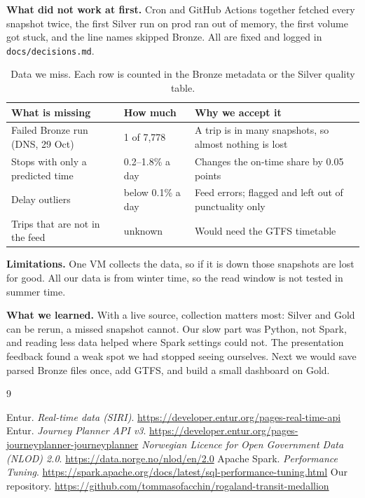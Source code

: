\documentclass[11pt,a4paper]{article}
\newcommand{\code}[1]{\texttt{#1}}
\begin{document}
\textbf{What did not work at first.} Cron and GitHub Actions together fetched every snapshot
twice, the first Silver run on prod ran out of memory, the first volume got stuck, and the line
names skipped Bronze. All are fixed and logged in \code{docs/decisions.md}.

\begin{table}[htb]
\centering\small
\renewcommand{\arraystretch}{1.25}
\begin{tabularx}{\linewidth}{@{}>{\raggedright}p{4.5cm}>{\raggedright}p{2.4cm}X@{}}
\toprule
What is missing & How much & Why we accept it \\
\midrule
Failed Bronze run (DNS, 29 Oct) & 1 of 7{,}778 & A trip is in many snapshots, so almost nothing is lost \\
Stops with only a predicted time & 0.2--1.8\% a day & Changes the on-time share by 0.05 points \\
Delay outliers & below 0.1\% a day & Feed errors; flagged and left out of punctuality only \\
Trips that are not in the feed & unknown & Would need the GTFS timetable \\
\bottomrule
\end{tabularx}
\caption{Data we miss. Each row is counted in the Bronze metadata or the Silver quality table.}
\label{tab:missing}
\end{table}

\textbf{Limitations.} One VM collects the data, so if it is down those snapshots are lost for
good. All our data is from winter time, so the read window is not tested in summer time.

\textbf{What we learned.} With a live source, collection matters most: Silver and Gold can be
rerun, a missed snapshot cannot. Our slow part was Python, not Spark, and reading less data
helped where Spark settings could not. The presentation feedback found a weak spot we had
stopped seeing ourselves. Next we would save parsed Bronze files once, add GTFS, and build a
small dashboard on Gold.

\begin{thebibliography}{9}
\raggedright
{} Entur. \emph{Real-time data (SIRI)}. \url{https://developer.entur.org/pages-real-time-api}
 Entur. \emph{Journey Planner API v3}. \url{https://developer.entur.org/pages-journeyplanner-journeyplanner}
 \emph{Norwegian Licence for Open Government Data (NLOD) 2.0}. \url{https://data.norge.no/nlod/en/2.0}
 Apache Spark. \emph{Performance Tuning}. \url{https://spark.apache.org/docs/latest/sql-performance-tuning.html}
 Our repository. \url{https://github.com/tommasofacchin/rogaland-transit-medallion}
\end{thebibliography}
\end{document}
